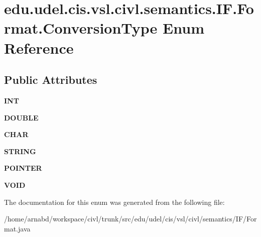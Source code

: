 \hypertarget{enumedu_1_1udel_1_1cis_1_1vsl_1_1civl_1_1semantics_1_1IF_1_1Format_1_1ConversionType}{}\section{edu.\+udel.\+cis.\+vsl.\+civl.\+semantics.\+I\+F.\+Format.\+Conversion\+Type Enum Reference}
\label{enumedu_1_1udel_1_1cis_1_1vsl_1_1civl_1_1semantics_1_1IF_1_1Format_1_1ConversionType}
\subsection*{Public Attributes}
\begin{DoxyCompactItemize}
\item 
\hypertarget{enumedu_1_1udel_1_1cis_1_1vsl_1_1civl_1_1semantics_1_1IF_1_1Format_1_1ConversionType_a36cf1af3e2ffc6d3071f9eb718b34da4}{}{\bfseries I\+N\+T}\label{enumedu_1_1udel_1_1cis_1_1vsl_1_1civl_1_1semantics_1_1IF_1_1Format_1_1ConversionType_a36cf1af3e2ffc6d3071f9eb718b34da4}

\item 
\hypertarget{enumedu_1_1udel_1_1cis_1_1vsl_1_1civl_1_1semantics_1_1IF_1_1Format_1_1ConversionType_ae423245870e1f5c60b4e7c156ebedd54}{}{\bfseries D\+O\+U\+B\+L\+E}\label{enumedu_1_1udel_1_1cis_1_1vsl_1_1civl_1_1semantics_1_1IF_1_1Format_1_1ConversionType_ae423245870e1f5c60b4e7c156ebedd54}

\item 
\hypertarget{enumedu_1_1udel_1_1cis_1_1vsl_1_1civl_1_1semantics_1_1IF_1_1Format_1_1ConversionType_ace66fd4c2c67fbeb55dd93e116d7e8ab}{}{\bfseries C\+H\+A\+R}\label{enumedu_1_1udel_1_1cis_1_1vsl_1_1civl_1_1semantics_1_1IF_1_1Format_1_1ConversionType_ace66fd4c2c67fbeb55dd93e116d7e8ab}

\item 
\hypertarget{enumedu_1_1udel_1_1cis_1_1vsl_1_1civl_1_1semantics_1_1IF_1_1Format_1_1ConversionType_a47f16788d2e935ca60fbce6d3629089b}{}{\bfseries S\+T\+R\+I\+N\+G}\label{enumedu_1_1udel_1_1cis_1_1vsl_1_1civl_1_1semantics_1_1IF_1_1Format_1_1ConversionType_a47f16788d2e935ca60fbce6d3629089b}

\item 
\hypertarget{enumedu_1_1udel_1_1cis_1_1vsl_1_1civl_1_1semantics_1_1IF_1_1Format_1_1ConversionType_aabf195637796c040af225eebd65eac88}{}{\bfseries P\+O\+I\+N\+T\+E\+R}\label{enumedu_1_1udel_1_1cis_1_1vsl_1_1civl_1_1semantics_1_1IF_1_1Format_1_1ConversionType_aabf195637796c040af225eebd65eac88}

\item 
\hypertarget{enumedu_1_1udel_1_1cis_1_1vsl_1_1civl_1_1semantics_1_1IF_1_1Format_1_1ConversionType_a375971f4dd1b574a4d28e0964a2fe17a}{}{\bfseries V\+O\+I\+D}\label{enumedu_1_1udel_1_1cis_1_1vsl_1_1civl_1_1semantics_1_1IF_1_1Format_1_1ConversionType_a375971f4dd1b574a4d28e0964a2fe17a}

\end{DoxyCompactItemize}


The documentation for this enum was generated from the following file\+:\begin{DoxyCompactItemize}
\item 
/home/arnabd/workspace/civl/trunk/src/edu/udel/cis/vsl/civl/semantics/\+I\+F/Format.\+java\end{DoxyCompactItemize}
